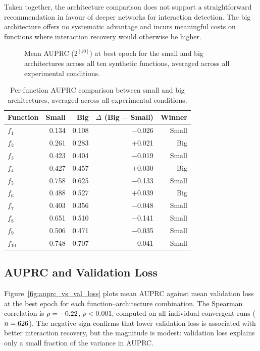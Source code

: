 \documentclass{article}
\begin{document}
Taken together, the architecture comparison does not support a straightforward
recommendation in favour of deeper networks for interaction detection. The big
architecture offers no systematic advantage and incurs meaningful costs on
functions where interaction recovery would otherwise be higher.

\begin{figure}[htbp]
    \centering
    
    \caption{Mean AUPRC ($2^{[10]}$) at best epoch for the small and big
    architectures across all ten synthetic functions, averaged across all
    experimental conditions.}
    \label{fig:architecture_comparison}
\end{figure}


\begin{table}[htbp]
\centering
\caption{Per-function AUPRC comparison between small and big architectures,
averaged across all experimental conditions.}
\label{tab:architecture_comparison}
\begin{tabular}{lrrrr}
\toprule
Function & Small & Big & $\Delta$ (Big $-$ Small) & Winner \\
\midrule
$f_1$  & 0.134 & 0.108 & $-$0.026 & Small \\
$f_2$  & 0.261 & 0.283 & $+$0.021 & Big \\
$f_3$  & 0.423 & 0.404 & $-$0.019 & Small \\
$f_4$  & 0.427 & 0.457 & $+$0.030 & Big \\
$f_5$  & 0.758 & 0.625 & $-$0.133 & Small \\
$f_6$  & 0.488 & 0.527 & $+$0.039 & Big \\
$f_7$  & 0.403 & 0.356 & $-$0.048 & Small \\
$f_8$  & 0.651 & 0.510 & $-$0.141 & Small \\
$f_9$  & 0.506 & 0.471 & $-$0.035 & Small \\
$f_{10}$ & 0.748 & 0.707 & $-$0.041 & Small \\
\bottomrule
\end{tabular}
\end{table}

\FloatBarrier


\subsection{AUPRC and Validation Loss}

Figure~\ref{fig:auprc_vs_val_loss} plots mean AUPRC against mean validation loss
at the best epoch for each function--architecture combination. The Spearman
correlation is \(\rho = -0.22\), \(p < 0.001\), computed on all
individual convergent runs ( \(n = 626\)). The negative sign confirms
that lower validation loss is associated with better interaction recovery, but the
magnitude is modest: validation loss explains only a small fraction of the
variance in AUPRC.
\end{document}
